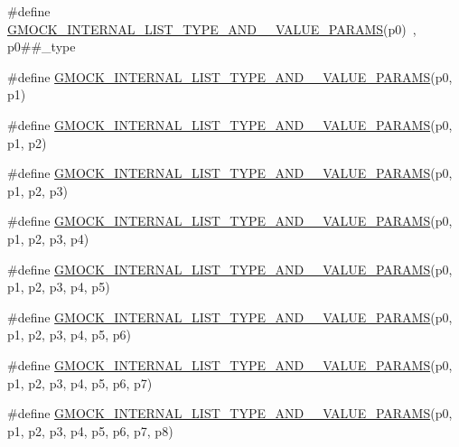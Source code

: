 \begin{DoxyCompactItemize}
\item 
\#define \mbox{\hyperlink{gmock-generated-actions_8h_aa6b8f71158f750363cbf016eb92e0865}{G\+M\+O\+C\+K\+\_\+\+I\+N\+T\+E\+R\+N\+A\+L\+\_\+\+L\+I\+S\+T\+\_\+\+T\+Y\+P\+E\+\_\+\+A\+N\+D\+\_\+\_\+\+V\+A\+L\+U\+E\+\_\+\+P\+A\+R\+A\+MS}}(p0)~, p0\#\#\+\_\+type
\item 
\#define \mbox{\hyperlink{gmock-generated-actions_8h_a0cc50d9b0c031e712a38a3266b03af48}{G\+M\+O\+C\+K\+\_\+\+I\+N\+T\+E\+R\+N\+A\+L\+\_\+\+L\+I\+S\+T\+\_\+\+T\+Y\+P\+E\+\_\+\+A\+N\+D\+\_\+\_\+\+V\+A\+L\+U\+E\+\_\+\+P\+A\+R\+A\+MS}}(p0,  p1)
\item 
\#define \mbox{\hyperlink{gmock-generated-actions_8h_a5654c0d7f59fc85880c24738b6cb5976}{G\+M\+O\+C\+K\+\_\+\+I\+N\+T\+E\+R\+N\+A\+L\+\_\+\+L\+I\+S\+T\+\_\+\+T\+Y\+P\+E\+\_\+\+A\+N\+D\+\_\+\_\+\+V\+A\+L\+U\+E\+\_\+\+P\+A\+R\+A\+MS}}(p0,  p1,  p2)
\item 
\#define \mbox{\hyperlink{gmock-generated-actions_8h_ad00ece06c41ce47e499fef47d0ee9459}{G\+M\+O\+C\+K\+\_\+\+I\+N\+T\+E\+R\+N\+A\+L\+\_\+\+L\+I\+S\+T\+\_\+\+T\+Y\+P\+E\+\_\+\+A\+N\+D\+\_\+\_\+\+V\+A\+L\+U\+E\+\_\+\+P\+A\+R\+A\+MS}}(p0,  p1,  p2,  p3)
\item 
\#define \mbox{\hyperlink{gmock-generated-actions_8h_a48e2764f7132a1840c2a4afe8d43556b}{G\+M\+O\+C\+K\+\_\+\+I\+N\+T\+E\+R\+N\+A\+L\+\_\+\+L\+I\+S\+T\+\_\+\+T\+Y\+P\+E\+\_\+\+A\+N\+D\+\_\+\_\+\+V\+A\+L\+U\+E\+\_\+\+P\+A\+R\+A\+MS}}(p0,  p1,  p2,  p3,  p4)
\item 
\#define \mbox{\hyperlink{gmock-generated-actions_8h_ab2f48b9bf3f455e081eac982aee31740}{G\+M\+O\+C\+K\+\_\+\+I\+N\+T\+E\+R\+N\+A\+L\+\_\+\+L\+I\+S\+T\+\_\+\+T\+Y\+P\+E\+\_\+\+A\+N\+D\+\_\+\_\+\+V\+A\+L\+U\+E\+\_\+\+P\+A\+R\+A\+MS}}(p0,  p1,  p2,  p3,  p4,  p5)
\item 
\#define \mbox{\hyperlink{gmock-generated-actions_8h_aa090e804a45b4373d38e6a0aa35e5997}{G\+M\+O\+C\+K\+\_\+\+I\+N\+T\+E\+R\+N\+A\+L\+\_\+\+L\+I\+S\+T\+\_\+\+T\+Y\+P\+E\+\_\+\+A\+N\+D\+\_\+\_\+\+V\+A\+L\+U\+E\+\_\+\+P\+A\+R\+A\+MS}}(p0,  p1,  p2,  p3,  p4,  p5,  p6)
\item 
\#define \mbox{\hyperlink{gmock-generated-actions_8h_ac46093455522025b3461ed0dfd326836}{G\+M\+O\+C\+K\+\_\+\+I\+N\+T\+E\+R\+N\+A\+L\+\_\+\+L\+I\+S\+T\+\_\+\+T\+Y\+P\+E\+\_\+\+A\+N\+D\+\_\+\_\+\+V\+A\+L\+U\+E\+\_\+\+P\+A\+R\+A\+MS}}(p0,  p1,  p2,  p3,  p4,  p5,  p6,  p7)
\item 
\#define \mbox{\hyperlink{gmock-generated-actions_8h_a3f7dd2bdf5feb78d9cd6a538366fed46}{G\+M\+O\+C\+K\+\_\+\+I\+N\+T\+E\+R\+N\+A\+L\+\_\+\+L\+I\+S\+T\+\_\+\+T\+Y\+P\+E\+\_\+\+A\+N\+D\+\_\+\_\+\+V\+A\+L\+U\+E\+\_\+\+P\+A\+R\+A\+MS}}(p0,  p1,  p2,  p3,  p4,  p5,  p6,  p7,  p8)

\end{DoxyCompactItemize}
